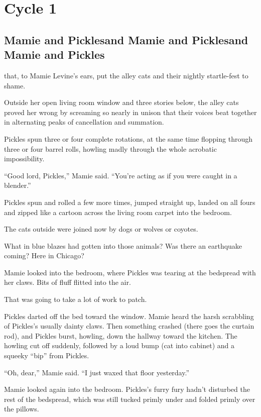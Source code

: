 \part{Cycle 1}

\chapter{Mamie and Pickles\break and Mamie and Pickles\break and Mamie and Pickles}

 that, to Mamie Levine's ears, put the alley cats and their nightly startle-fest to shame.

Outside her open living room window and three stories below, the alley cats proved her wrong by screaming so nearly in unison that their voices beat together in alternating peaks of cancellation and summation.

Pickles spun three or four complete rotations, at the same time flopping through three or four barrel rolls, howling madly through the whole acrobatic impossibility.

``Good lord, Pickles,'' Mamie said. ``You're acting as if you were caught in a blender.''

Pickles spun and rolled a few more times, jumped straight up, landed on all fours and zipped like a cartoon across the living room carpet into the bedroom.

The cats outside were joined now by dogs or wolves or coyotes.

What in blue blazes had gotten into those animals? Was there an earthquake coming? Here in Chicago?

Mamie looked into the bedroom, where Pickles was tearing at the bedspread with her claws. Bits of fluff flitted into the air.

That was going to take a lot of work to patch.

Pickles darted off the bed toward the window. Mamie heard the harsh scrabbling of Pickles's usually dainty claws. Then something crashed (there goes the curtain rod), and Pickles burst, howling, down the hallway toward the kitchen. The howling cut off suddenly, followed by a loud bump (cat into cabinet) and a squeeky ``bip'' from Pickles.

``Oh, dear,'' Mamie said. ``I just waxed that floor yesterday.''

Mamie looked again into the bedroom. Pickles's furry fury hadn't disturbed the rest of the bedspread, which was still tucked primly under and folded primly over the pillows.

